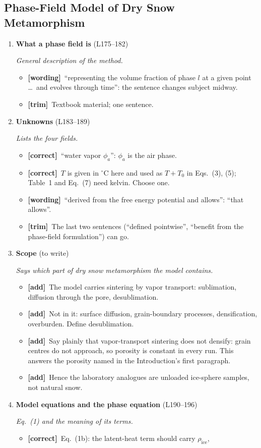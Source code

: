 \documentclass[11pt]{article}
\newcommand{\Pg}[3]{\item \textbf{#1} {\small(#2)}\par\textit{#3}}
\newcommand{\tC}{\textcolor{miss}{\textbf{[correct]}}\ }
\newcommand{\tG}{\textcolor{stale}{\textbf{[wording]}}\ }
\newcommand{\tT}{\textcolor{cut}{\textbf{[trim]}}\ }
\newcommand{\tA}{\textcolor{have}{\textbf{[add]}}\ }
\begin{document}
\subsection{Phase-Field Model of Dry Snow Metamorphism}
\begin{enumerate}
\Pg{What a phase field is}{L175--182}{General description of the method.}
  \begin{itemize}
  \item \tG ``representing the volume fraction of phase $l$ at a given point
    \ldots\ and evolves through time'': the sentence changes subject midway.
  \item \tT Textbook material; one sentence.
  \end{itemize}
\Pg{Unknowns}{L183--189}{Lists the four fields.}
  \begin{itemize}
  \item \tC ``water vapor $\phi_a$'': $\phi_a$ is the air phase.
  \item \tC $T$ is given in $^{\circ}$C here and used as $T + T_0$ in
    Eqs.~(3), (5); Table~1 and Eq.~(7) need kelvin. Choose one.
  \item \tG ``derived from the free energy potential and allows'': ``that
    allows''.
  \item \tT The last two sentences (``defined pointwise'', ``benefit from the
    phase-field formulation'') can go.
  \end{itemize}
\Pg{Scope}{to write}{Says which part of dry snow metamorphism the model contains.}
  \begin{itemize}
  \item \tA The model carries sintering by vapor transport: sublimation,
    diffusion through the pore, desublimation.
  \item \tA Not in it: surface diffusion, grain-boundary processes,
    densification, overburden. Define desublimation.
  \item \tA Say plainly that vapor-transport sintering does not densify: grain
    centres do not approach, so porosity is constant in every run. This
    answers the porosity named in the Introduction's first paragraph.
  \item \tA Hence the laboratory analogues are unloaded ice-sphere samples,
    not natural snow.
  \end{itemize}
\Pg{Model equations and the phase equation}{L190--196}{Eq.~(1) and the meaning of its terms.}
  \begin{itemize}
  \item \tC Eq.~(1b): the latent-heat term should carry $\rho_{\mathrm{ice}}$,

\end{itemize}
\end{enumerate}
\end{document}
